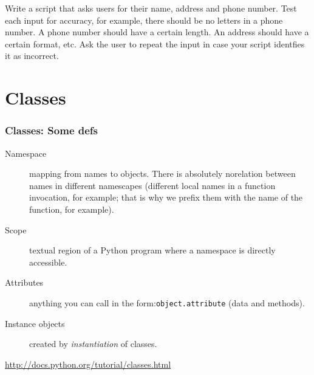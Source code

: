 \documentclass{beamer}
\begin{document}
\begin{frame}[containsverbatim]
\begin{example}
Write a script that asks users for their name, address and phone number. Test each input for accuracy, for example, there should be no letters in a phone number. A phone number should have a certain length. An address should have a certain format, etc. Ask the user to repeat the input in case your script identfies it as incorrect.
\end{example}
\end{frame}


\section{Classes}

\begin{frame}
\frametitle{Classes: Some defs}
\begin{description}
\item[Namespace] mapping from names to objects. There is absolutely norelation between names in different namescapes (different local names in a function invocation, for example; that is why we prefix them with the name of the function, for example).
\item[Scope]  textual region of a Python program where a namespace is directly accessible.
\item[Attributes]  anything you can call in the form:\texttt{object.attribute} (data and methods).
\item[Instance objects] created by {\em instantiation} of classes.
\end{description}
\url{http://docs.python.org/tutorial/classes.html}
\end{frame}
\end{document}
